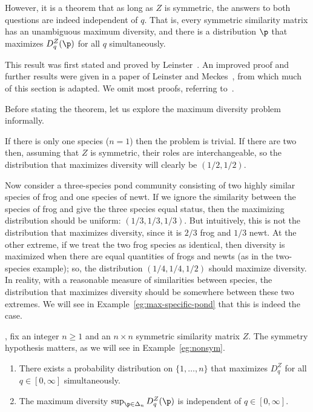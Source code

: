 However, it is a theorem that as long as $Z$ is symmetric, the answers to
both questions are indeed independent of $q$.  That is, every symmetric
similarity matrix has an unambiguous maximum diversity, and there is a
distribution $\p$ that maximizes $D_q^Z(\p)$ for all $q$ simultaneously.

This result was first stated and proved by Leinster~\cite{METAMB}.  An
improved proof and further results were given in a paper of Leinster and
Meckes~\cite{MDBB},%
%
% 
from which much of this section is adapted.  We omit most proofs, referring
to~\cite{MDBB}.

Before stating the theorem, let us explore the maximum diversity problem
informally.

\begin{examples}
If there is only one species ($n = 1$) then the problem is trivial.  If
there are two then, assuming that $Z$ is symmetric, their roles are
interchangeable, so the distribution that maximizes diversity will clearly
be $(1/2, 1/2)$.

Now consider a three-species pond community consisting of two highly
similar species of frog and one species of newt.  If we ignore the
similarity between the species of frog and give the three species equal
status, then the maximizing distribution should be uniform: $(1/3, 1/3,
1/3)$.  But intuitively, this is not the distribution that maximizes
diversity, since it is $2/3$ frog and $1/3$ newt.  At the other extreme, if
we treat the two frog species as identical, then diversity is maximized
when there are equal quantities of frogs and newts (as in the two-species
example); so, the distribution $(1/4, 1/4, 1/2)$ should maximize diversity.
In reality, with a reasonable measure of similarities between species, the
distribution that maximizes diversity should be somewhere between these two
extremes.  We will see in Example~\ref{eg:max-specific-pond} that this is
indeed the case.
\end{examples}

, fix an integer $n \geq 1$ and an $n
\times n$ symmetric similarity matrix $Z$.  The symmetry hypothesis
matters, as we will see in Example~\ref{eg:nonsym}.

\begin{thm}
%
% 
\begin{enumerate}
\item 
{}
There exists a probability distribution on $\{1, \ldots, n\}$ that
maximizes $D_q^Z$ for all $q \in [0, \infty]$ simultaneously.

\item
{}
The maximum diversity $\sup_{\p \in \Delta_n} D_q^Z(\p)$ is independent of
$q \in [0, \infty]$.
\end{enumerate}
\end{thm}


